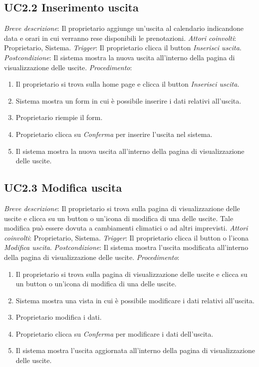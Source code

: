 \subsection{UC2.2 Inserimento uscita}

\noindent \emph{Breve descrizione}: Il proprietario aggiunge un'uscita al calendario indicandone data e orari in cui verranno rese disponibili le prenotazioni.\medbreak
\noindent \emph{Attori coinvolti}: Proprietario, Sistema.\medbreak
\noindent \emph{Trigger}: Il proprietario clicca il button \textit{Inserisci uscita}.\medbreak
\noindent \emph{Postcondizione}: Il sistema mostra la nuova uscita all'interno della pagina di visualizzazione delle uscite.\medbreak
\noindent \emph{Procedimento}:

\begin{enumerate}
    \item Il proprietario si trova sulla home page e clicca il button \textit{Inserisci uscita}.
    \item Sistema mostra un form in cui è possibile inserire i dati relativi all'uscita.
    \item Proprietario riempie il form.
    \item Proprietario clicca su \textit{Conferma} per inserire l'uscita nel sistema.
    \item Il sistema mostra la nuova uscita all'interno della pagina di visualizzazione delle uscite.
\end{enumerate}

\subsection{UC2.3 Modifica uscita}

\noindent \emph{Breve descrizione}: Il proprietario si trova sulla pagina di visualizzazione delle uscite e clicca su un button o un'icona di modifica di una delle uscite.
Tale modifica può essere dovuta a cambiamenti climatici o ad altri imprevisti.\medbreak
\noindent \emph{Attori coinvolti}: Proprietario, Sistema.\medbreak
\noindent \emph{Trigger}: Il proprietario clicca il button o l'icona \textit{Modifica uscita}.\medbreak
\noindent \emph{Postcondizione}: Il sistema mostra l'uscita modificata all'interno della pagina di visualizzazione delle uscite.\medbreak
\noindent \emph{Procedimento}:

\begin{enumerate}
    \item Il proprietario si trova sulla pagina di visualizzazione delle uscite e clicca su un button o un'icona di modifica di una delle uscite.
    \item Sistema mostra una vista in cui è possibile modificare i dati relativi all'uscita.
    \item Proprietario modifica i dati.
    \item Proprietario clicca su \textit{Conferma} per modificare i dati dell'uscita.
    \item Il sistema mostra l'uscita aggiornata all'interno della pagina di visualizzazione delle uscite.
\end{enumerate}

